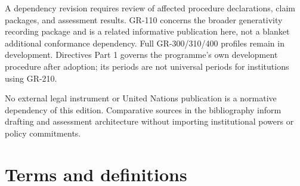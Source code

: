 \documentclass[11pt,a4paper]{article}
\begin{document}
A dependency revision requires review of affected procedure declarations, claim packages, and assessment results. GR-110 concerns the broader generativity recording package and is a related informative publication here, not a blanket additional conformance dependency. Full GR-300/310/400 profiles remain in development. Directives Part 1 governs the programme's own development procedure after adoption; its periods are not universal periods for institutions using GR-210.

No external legal instrument or United Nations publication is a normative dependency of this edition. Comparative sources in the bibliography inform drafting and assessment architecture without importing institutional powers or policy commitments.

\section{Terms and definitions}
\end{document}
